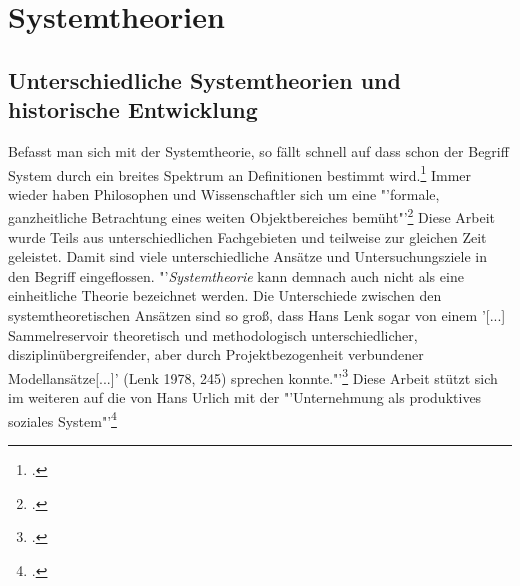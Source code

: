 \documentclass[a4paper,12pt]{article}
\begin{document}
\section{Systemtheorien}
\subsection{Unterschiedliche Systemtheorien und historische Entwicklung}
Befasst man sich mit der Systemtheorie, so fällt schnell auf dass schon der Begriff System durch ein breites Spektrum an Definitionen bestimmt wird.\footcite[S. 18]{Patzak1982} Immer wieder haben Philosophen und Wissenschaftler sich um eine "'formale, ganzheitliche Betrachtung eines weiten Objektbereiches bemüht"'\footcite[S. 102]{Ulrich1968} Diese Arbeit wurde Teils aus unterschiedlichen Fachgebieten und teilweise zur gleichen Zeit geleistet. Damit sind viele unterschiedliche Ansätze und Untersuchungsziele in den Begriff eingeflossen. "'\textit{Systemtheorie} kann demnach auch nicht als eine einheitliche Theorie bezeichnet werden. Die Unterschiede zwischen den systemtheoretischen Ansätzen sind so groß, dass Hans Lenk sogar von einem '[...] Sammelreservoir theoretisch und methodologisch unterschiedlicher, disziplinübergreifender, aber durch Projektbezogenheit verbundener Modellansätze[...]' (Lenk 1978, 245) sprechen konnte."'\footcite[S. 111]{Diesner2015}
Diese Arbeit stützt sich im weiteren auf die von Hans Urlich mit der "'Unternehmung als produktives soziales System"'\footcite[S. 3]{Ulrich1968}
\end{document}
